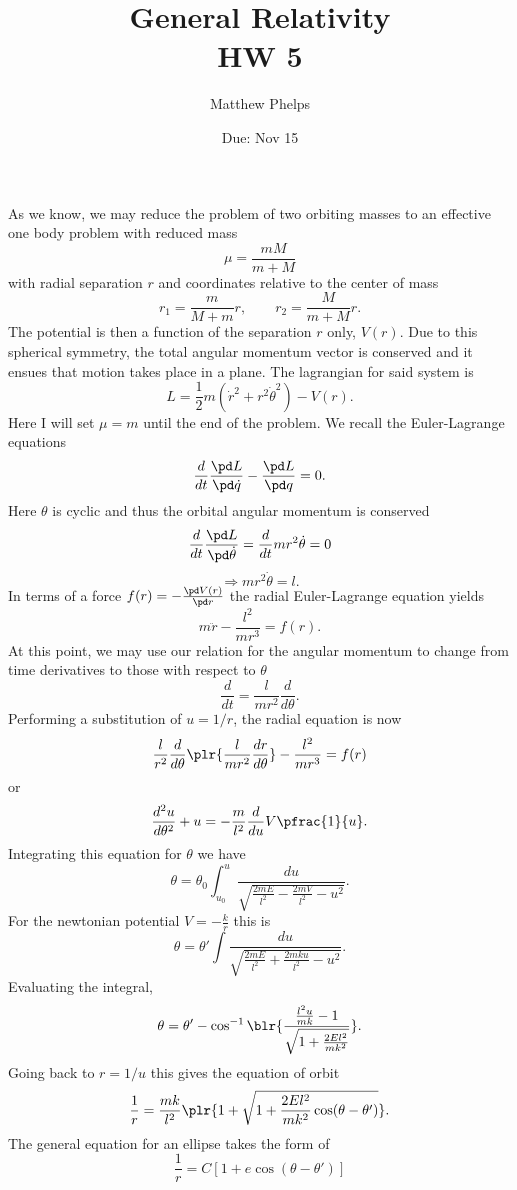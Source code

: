 \documentclass[10pt,letterpaper]{article}
\title{General Relativity\\HW 5}
\author{Matthew Phelps}
\date{Due: Nov 15}
\begin{document}
\maketitle

\benum
\item
\benum
\item
As we know, we may reduce the problem of two orbiting masses to an effective one body problem with
reduced mass
\[
	\mu = \frac{mM}{m+M}
\]
with radial separation $r$ and coordinates relative to the center of mass
\[
	r_1 = \frac{ m}{M+m}r,\qquad r_2 = \frac{M}{m+M}r.
\]
The potential is then a function of the separation $r$ only, $V(r)$. Due to this spherical symmetry, the total angular momentum vector is conserved and it ensues that motion takes place in a plane. The lagrangian for said system is
\[
	 L = \frac 12 m(\dot r^2+r^2 \dot\theta ^2)-V(r).
\]
Here I will set $\mu = m$ until the end of the problem.
We recall the Euler-Lagrange equations
\[
	\frac{d}{dt} \frac{ \pd L}{\pd \dot q} - \frac{\pd L}{\pd q} = 0.
\]
Here $\theta$ is cyclic and thus the orbital angular momentum is conserved
\[
	\frac{d}{dt} \frac{\pd L}{\pd \dot\theta} = \frac{d}{dt} mr^2\dot\theta = 0
\]
\[
	\Rightarrow mr^2\dot\theta = l.
\]
In terms of a force $f(r) = -\frac{\pd V(r)}{\pd r}$ the radial Euler-Lagrange equation yields
\[
	m\ddot r - \frac{l^2}{mr^3} = f(r).
\]
At this point, we may use our relation for the angular momentum to change from time derivatives to those with respect to $\theta$
\[
	\frac{d}{dt} = \frac{l}{mr^2}\frac{d}{d\theta}.
\]
Performing a substitution of $u = 1/r$, the radial equation is now
\[
	\frac{l}{r^2} \frac{d}{d\theta} \plr{ \frac{ l}{mr^2}\frac{dr}{d\theta}} - \frac{l^2}{mr^3} = f(r)
\]
or 
\[
	\frac{d^2u}{d\theta^2}+u = -\frac{m}{l^2}\frac{d}{du}V\pfrac{1}{u}.
\]
Integrating this equation for $\theta$ we have
\[
	\theta = \theta_0 \int_{u_0}^u \frac{ du}{\sqrt{ \frac{2mE}{l^2}-\frac{2mV}{l^2}-u^2}}.
\]
For the newtonian potential $V = -\frac{k}{r}$
this is
\[
	\theta = \theta' \int \frac{du}{\sqrt{\frac{2mE}{l^2} +\frac{2mku}{l^2}-u^2}}. 
\]
Evaluating the integral,
\[
	\theta = \theta' -\cos^{-1}\blr{ \frac{ \frac{l^2u}{mk}-1}{\sqrt{ 1+\frac{2El^2}{mk^2}}}}.
\]
Going back to $r = 1/u$ this gives the equation of orbit
\[
	\frac{1}{r} = \frac{mk}{l^2}\plr{ 1+\sqrt{ 1+\frac{2El^2}{mk^2}\cos(\theta-\theta')}}.
\]
The general equation for an ellipse takes the form of
\[
	\frac{1}{r} = C[1+e\cos(\theta-\theta')]
\]
\end{document}
